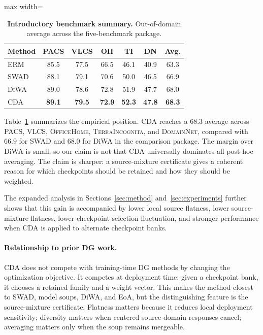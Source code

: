 \documentclass{article}
\newif\ifsubmissionmode
\newcommand{\placeholderguard}[1]{%
  \ifsubmissionmode
    \PackageError{cda_final_v2}{Provisional red content remains in submission mode}{Remove all provisional red content before building in submission mode.}%
  \else
    {\color{red!70!black}#1}%
  \fi
}
\newcommand{\prov}[1]{\placeholderguard{#1}}
\newcommand{\data}[1]{\textsc{#1}}
\theoremstyle{definition}
\newcommand{\cda}{\textup{\textsc{CDA}}}
\newcommand{\swad}{\textup{\textsc{SWAD}}}
\newcommand{\diwa}{\textup{\textsc{DiWA}}}
\newcommand{\tabfont}{\scriptsize}
\begin{document}
\begin{table}
\vspace{-1.5em}
\centering
\tabfont
\caption{\small \textbf{Introductory benchmark summary.} Out-of-domain average across the five-benchmark package.}
\label{tab:intro_summary}
\vspace{-.5em}
\begin{adjustbox}{max width=\linewidth}
\begin{tabular}{lcccccc}
\toprule
Method & PACS & VLCS & OH & TI & DN & Avg.\\
\midrule
ERM & 85.5 & 77.5 & 66.5 & 46.1 & 40.9 & 63.3\\
\swad{} & 88.1 & 79.1 & 70.6 & 50.0 & 46.5 & 66.9\\
\diwa{} & 89.0 & 78.6 & 72.8 & 51.9 & 47.7 & 68.0\\
\cda{} & \textbf{89.1} & \textbf{79.5} & \textbf{72.9} & \textbf{52.3} & \textbf{47.8} & \textbf{68.3}\\
\bottomrule
\end{tabular}
\end{adjustbox}
\vspace{-1.0em}
\end{table}

Table~\ref{tab:intro_summary} summarizes the empirical position. CDA reaches a \(68.3\) average across \data{PACS}, \data{VLCS}, \data{OfficeHome}, \data{TerraIncognita}, and \data{DomainNet}, compared with \(66.9\) for SWAD and \(68.0\) for DiWA in the comparison package. The margin over DiWA is small, so our claim is not that CDA universally dominates all post-hoc averaging. The claim is sharper: a source-mixture certificate gives a coherent reason for which checkpoints should be retained and how they should be weighted. \prov{The expanded analysis in Sections~\ref{sec:method} and~\ref{sec:experiments} further shows that this gain is accompanied by lower local source flatness, lower source-mixture flatness, lower checkpoint-selection fluctuation, and stronger performance when CDA is applied to alternate checkpoint banks.}

\paragraph{Relationship to prior DG work.}
CDA does not compete with training-time DG methods by changing the optimization objective. It competes at deployment time: given a checkpoint bank, it chooses a retained family and a weight vector. This makes the method closest to SWAD, model soups, DiWA, and EoA, but the distinguishing feature is the source-mixture certificate. Flatness matters because it reduces local deployment sensitivity; diversity matters when centered source-domain responses cancel; averaging matters only when the soup remains mergeable.
\end{document}
